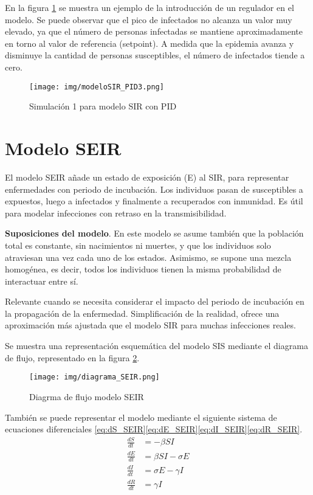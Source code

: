 En la figura \ref{fig:simu3pid} se muestra un ejemplo de la introducción de un regulador en el modelo. Se puede observar que el pico de infectados no alcanza un valor muy elevado, ya que el número de personas infectadas se mantiene aproximadamente en torno al valor de referencia (setpoint). A medida que la epidemia avanza y disminuye la cantidad de personas susceptibles, el número de infectados tiende a cero.
\begin{figure}[H]
    \centering
    \texttt{[image: img/modeloSIR\_PID3.png]}
    \caption{Simulación 1 para modelo SIR con PID}
    \label{fig:simu3pid}
    \vspace{0.5cm} %
\end{figure}

\section{Modelo SEIR}
El modelo SEIR añade un estado de exposición (E) al SIR, para representar enfermedades con periodo de incubación. Los individuos pasan de susceptibles a expuestos, luego a infectados y finalmente a recuperados con inmunidad. Es útil para modelar infecciones con retraso en la transmisibilidad.

\textbf{Suposiciones del modelo}. En este modelo se asume también que la población total es constante, sin nacimientos ni muertes, y que los individuos solo atraviesan una vez cada uno de los estados. Asimismo, se supone una mezcla homogénea, es decir, todos los individuos tienen la misma probabilidad de interactuar entre sí.

Relevante cuando se necesita considerar el impacto del periodo de incubación en la propagación de la enfermedad. Simplificación de la realidad, ofrece una aproximación más ajustada que el modelo SIR para muchas infecciones reales.

Se muestra una representación esquemática del modelo SIS mediante el diagrama de flujo, representado en la figura \ref{fig:diagrama SEIR}.
\begin{figure}[H]
    \centering
    \texttt{[image: img/diagrama\_SEIR.png]}
    \caption{Diagrma de flujo modelo SEIR}
    \label{fig:diagrama SEIR}
    \vspace{0.5cm} %
\end{figure}

También se puede representar el modelo mediante el siguiente sistema de ecuaciones diferenciales \eqref{eq:dS_SEIR}\eqref{eq:dE_SEIR}\eqref{eq:dI_SEIR}\eqref{eq:dR_SEIR}. 
\begin{align}
\frac{dS}{dt} &= -\beta SI \label{eq:dS_SEIR} \\
\frac{dE}{dt} &= \beta SI - \sigma E \label{eq:dE_SEIR} \\
\frac{dI}{dt} &= \sigma E - \gamma I \label{eq:dI_SEIR} \\
\frac{dR}{dt} &= \gamma I \label{eq:dR_SEIR}
\end{align}

